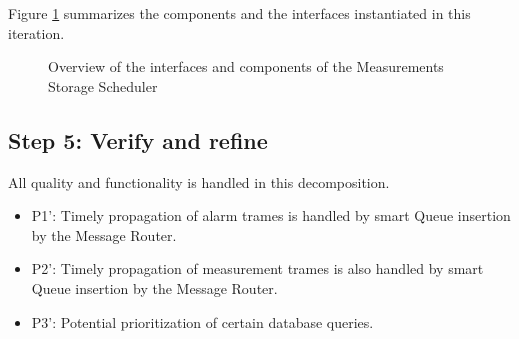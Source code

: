 \npar Figure \ref{fig:it3/interfaces} summarizes the components and the
interfaces instantiated in this iteration.

\begin{figure}[H]
	\begin{centering}
		\caption{Overview of the interfaces and components of the Measurements Storage
		Scheduler}
		\label{fig:it3/interfaces}
	\end{centering}
\end{figure}

\subsection{Step 5: Verify and refine}
\label{add:it3/verification}


\npar All quality and functionality is handled in this decomposition.  

\begin{itemize}
	\item P1': Timely propagation of alarm trames is handled by smart Queue
	insertion by the Message Router. 
	\item P2': Timely propagation of measurement trames is also handled by smart
	Queue insertion by the Message Router. 
	\item P3': Potential prioritization of certain database queries. 
\end{itemize}